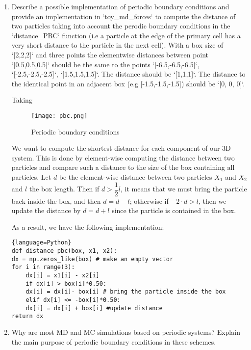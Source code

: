 \documentclass[12pt,letterpaper]{report}
\begin{document}
\begin{enumerate}
		\item
		Describe a possible implementation of periodic boundary conditions and provide an implementation in `toy\_md\_forces` to compute the distance of two particles taking into account the perodic boundary conditions in the `distance\_PBC` function (i.e a particle at the edge of the primary cell has a very short distance to the particle in the next cell). 
		With a box size of `[2,2,2]` and three points the elementwise distances between point `[0.5,0.5,0.5]` should be the same to the points `[-6.5,-6.5,-6.5]`, `[-2.5,-2.5,-2.5]`, `[1.5,1.5,1.5]`. The distance should be `[1,1,1]`. The distance to the identical point in an adjacent box (e.g [-1.5,-1.5,-1.5]) should be `[0, 0, 0]`.
		
		Taking 
		\begin{figure}[H]
			\centering
			\texttt{[image: pbc.png]}		
			\caption{Periodic boundary conditions}
			\label{fig::pcb}
		\end{figure}  
		
		We want to compute the shortest distance for each component of our 3D system. This is done by element-wise computing the  distance between two particles and compare such a distance to the size of the box containing all particles. Let $d$ be the element-wise distance between two particles $X_{1}$ and $X_{2}$ and $l$ the box length. Then if $d > \dfrac{1}{2} l$, it means that we must bring the particle back inside the box, and then $d = d - l$; otherwise if $-2\cdot d > l$, then we update the distance by $d = d + l$ since the particle is contained in the box.
		
		As a result, we have the following implementation:
		
\begin{lstlisting}{language=Python}
def distance_pbc(box, x1, x2):
dx = np.zeros_like(box) # make an empty vector
for i in range(3):
	dx[i] = x1[i] - x2[i]
	if dx[i] > box[i]*0.50: 
	dx[i] = dx[i]- box[i] # bring the particle inside the box
	elif dx[i] <= -box[i]*0.50:
	dx[i] = dx[i] + box[i] #update distance                     
return dx
\end{lstlisting}
		
		\item		
		Why are most MD and MC simulations based on periodic systems?
		Explain the main purpose of periodic boundary conditions in these schemes.
		

\end{enumerate}
\end{document}
